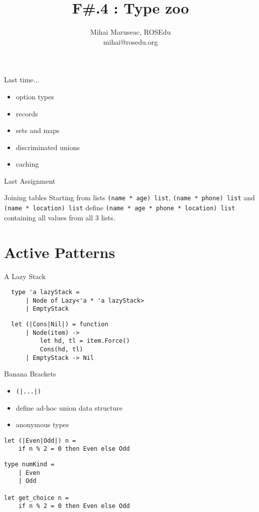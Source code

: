 \documentclass{beamer}
\title{F\#.4 : Type zoo}
\author{Mihai Maruseac, ROSEdu\\mihai@rosedu.org}
\begin{document}
\maketitle

\begin{frame}
  \tableofcontents
\end{frame}

\begin{frame}{Last time...}
  \begin{itemize}[<+->]
    \item option types
    \item records
    \item sets and maps
    \item discriminated unions
    \item caching
  \end{itemize}
\end{frame}

\begin{frame}{Last Assignment}
  \begin{block}{Joining tables}
  Starting from lists \texttt{(name * age) list}, \texttt{(name * phone) list}
and \texttt{(name * location) list} define \texttt{(name * age * phone *
location) list} containing all values from all 3 lists.
  \end{block}
\end{frame}

\section{Active Patterns}
\frame{\tableofcontents[currentsection]}

\begin{frame}[fragile]{A Lazy Stack}
  \begin{verbatim}
  type 'a lazyStack =
      | Node of Lazy<'a * 'a lazyStack>
      | EmptyStack
  \end{verbatim}
  \begin{verbatim}
  let (|Cons|Nil|) = function
      | Node(item) ->
          let hd, tl = item.Force()
          Cons(hd, tl)
      | EmptyStack -> Nil
  \end{verbatim}
\end{frame}

\begin{frame}[fragile]{Banana Brackets}
  \begin{itemize}[<+->]
    \item \texttt{(|...|)}
    \item define ad-hoc union data structure
    \item anonymous types
  \end{itemize}
  \pause
  \begin{verbatim}
let (|Even|Odd|) n =
    if n % 2 = 0 then Even else Odd
  \end{verbatim}
  \pause
  \begin{verbatim}
type numKind =
    | Even
    | Odd

let get_choice n =
    if n % 2 = 0 then Even else Odd
  \end{verbatim}
\end{frame}
\end{document}
